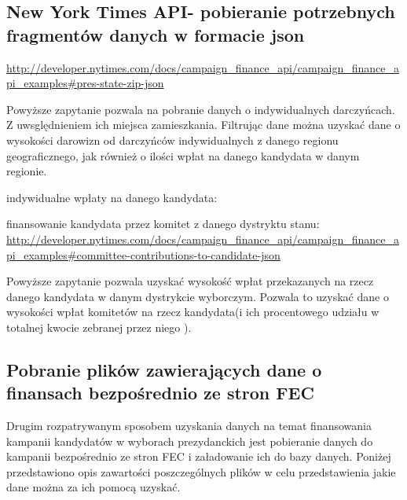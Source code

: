 \documentclass[10pt,a4paper]{article}
\begin{document}
\subsection{New York Times API- pobieranie potrzebnych fragmentów danych w formacie json}
\url{http://developer.nytimes.com/docs/campaign_finance_api/campaign_finance_api_examples#pres-state-zip-json}

Powyższe zapytanie pozwala na pobranie danych o indywidualnych darczyńcach. Z uwsględnieniem ich miejsca zamieszkania. Filtrując dane można uzyskać dane o wysokości darowizn od darczyńców indywidualnych  z danego regionu geograficznego,  jak również o ilości wpłat na danego kandydata w danym regionie.

indywidualne wpłaty na danego kandydata:


finansowanie kandydata przez komitet z danego dystryktu stanu:
\url{http://developer.nytimes.com/docs/campaign_finance_api/campaign_finance_api_examples#committee-contributions-to-candidate-json}

Powyższe zapytanie pozwala uzyskać wysokość wpłat przekazanych na rzecz danego kandydata w danym dystrykcie wyborczym. Pozwala to uzyskać dane o wysokości wpłat komitetów na rzecz kandydata(i ich procentowego udziału w totalnej kwocie zebranej przez niego ).

\subsection{Pobranie plików zawierających dane o finansach bezpośrednio ze stron FEC}

Drugim rozpatrywanym sposobem uzyskania danych na temat finansowania kampanii kandydatów w wyborach prezydanckich jest pobieranie danych do kampanii bezpośrednio ze stron FEC i załadowanie ich do bazy danych.
Poniżej przedstawiono opis zawartości poszczególnych plików w celu przedstawienia jakie dane można za ich pomocą uzyskać.
\end{document}
